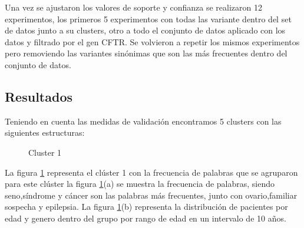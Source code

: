 Una vez se ajustaron los valores de soporte y confianza se realizaron 12 experimentos, los primeros 5 experimentos con todas las variante dentro del set de datos junto a su clusters, otro a todo el conjunto de datos aplicado con los datos y filtrado por el gen CFTR. Se volvieron a repetir los mismos experimentos pero removiendo las variantes sinónimas que son las más frecuentes dentro del conjunto de datos.


\subsection{Resultados} 

Teniendo en cuenta las medidas de validación encontramos  5 clusters con las siguientes estructuras:

\begin{figure}[H]
	\centering
	\label{f:nube1}
	\caption{Cluster 1} \label{fig:cluster1}
\end{figure} 

La figura \ref{fig:cluster1} representa el clúster 1 con la frecuencia de palabras que se agruparon para este clúster  la figura \ref{fig:cluster1}(a) se muestra la frecuencia de palabras, siendo seno,síndrome y cáncer son las palabras más frecuentes, junto con ovario,familiar sospecha y epilepsia. La figura \ref{fig:cluster1}(b) representa la distribución de pacientes por edad y genero dentro del grupo por rango de edad en un intervalo de 10 años.\\

